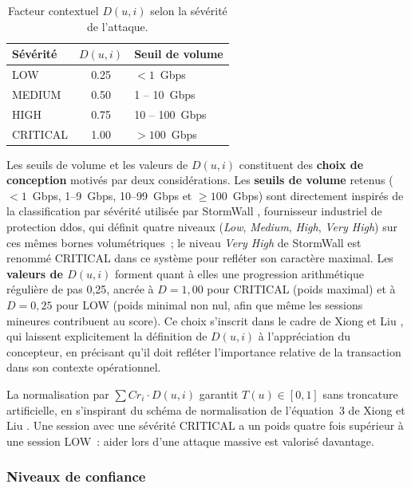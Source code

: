 \begin{table}[H]
\centering
\caption{Facteur contextuel $D(u,i)$ selon la sévérité de l'attaque.}
\label{tab:severity}
\small
\renewcommand{\arraystretch}{1.3}
\begin{tabular}{|l|c|l|}
\hline
\textbf{Sévérité} & \textbf{$D(u,i)$} & \textbf{Seuil de volume} \\
\hline
LOW      & 0.25 & $< 1$~Gbps \\
MEDIUM   & 0.50 & 1 -- 10~Gbps \\
HIGH     & 0.75 & 10 -- 100~Gbps \\
CRITICAL & 1.00 & $> 100$~Gbps \\
\hline
\end{tabular}
\end{table}

Les seuils de volume et les valeurs de $D(u,i)$ constituent des \textbf{choix de conception} motivés par deux considérations. Les \textbf{seuils de volume} retenus ($< 1$~Gbps, 1--9~Gbps, 10--99~Gbps et $\geq 100$~Gbps) sont directement inspirés de la classification par sévérité utilisée par StormWall \parencite{stormwall2024severity}, fournisseur industriel de protection \gls{ddos}, qui définit quatre niveaux (\textit{Low}, \textit{Medium}, \textit{High}, \textit{Very High}) sur ces mêmes bornes volumétriques~; le niveau \textit{Very High} de StormWall est renommé CRITICAL dans ce système pour refléter son caractère maximal. Les \textbf{valeurs de $D(u,i)$} forment quant à elles une progression arithmétique régulière de pas 0,25, ancrée à $D = 1{,}00$ pour CRITICAL (poids maximal) et à $D = 0{,}25$ pour LOW (poids minimal non nul, afin que même les sessions mineures contribuent au score). Ce choix s'inscrit dans le cadre de Xiong et Liu \parencite{xiong2004peertrust}, qui laissent explicitement la définition de $D(u,i)$ à l'appréciation du concepteur, en précisant qu'il doit refléter l'importance relative de la transaction dans son contexte opérationnel.

La normalisation par $\sum Cr_i \cdot D(u,i)$ garantit $T(u) \in [0,1]$ sans troncature artificielle, en s'inspirant du schéma de normalisation de l'équation~3 de Xiong et Liu \parencite{xiong2004peertrust}. Une session avec une sévérité CRITICAL a un poids quatre fois supérieur à une session LOW~: aider lors d'une attaque massive est valorisé davantage.

\subsubsection{Niveaux de confiance}

